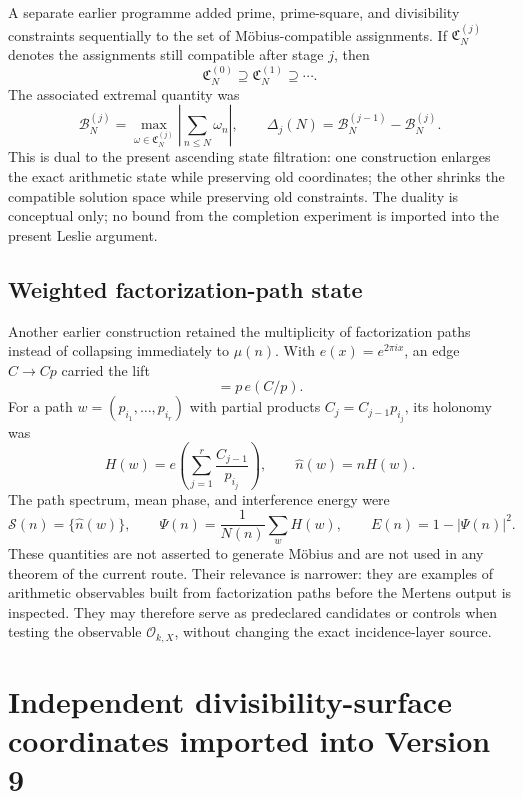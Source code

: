 \documentclass[11pt]{amsart}
\numberwithin{equation}{section}
\theoremstyle{plain}
\theoremstyle{definition}
\theoremstyle{remark}
\begin{document}
A separate earlier programme added prime, prime-square, and divisibility constraints sequentially
to the set of M\"obius-compatible assignments.  If $\mathfrak C_N^{(j)}$ denotes the assignments
still compatible after stage $j$, then
\[
\mathfrak C_N^{(0)}\supseteq\mathfrak C_N^{(1)}\supseteq\cdots.
\]
The associated extremal quantity was
\[
\mathcal B_N^{(j)}=
\max_{\omega\in\mathfrak C_N^{(j)}}
\left|\sum_{n\le N}\omega_n\right|,
\qquad
\Delta_j(N)=\mathcal B_N^{(j-1)}-\mathcal B_N^{(j)}.
\]
This is dual to the present ascending state filtration: one construction enlarges the exact
arithmetic state while preserving old coordinates; the other shrinks the compatible solution
space while preserving old constraints.  The duality is conceptual only; no bound from the
completion experiment is imported into the present Leslie argument.

\subsection{Weighted factorization-path state}

Another earlier construction retained the multiplicity of factorization paths instead of
collapsing immediately to $\mu(n)$.  With $e(x)=e^{2\pi i x}$, an edge
$C\to Cp$ carried the lift
\begin{equation}
[C:p]=p\,e(C/p).
\label{eq:v9_edge_lift}
\end{equation}
For a path $w=(p_{i_1},\ldots,p_{i_r})$ with partial products
$C_j=C_{j-1}p_{i_j}$, its holonomy was
\begin{equation}
H(w)=e\!\left(\sum_{j=1}^r\frac{C_{j-1}}{p_{i_j}}\right),
\qquad
\widehat n(w)=nH(w).
\label{eq:v9_path_holonomy}
\end{equation}
The path spectrum, mean phase, and interference energy were
\begin{equation}
\mathcal S(n)=\{\widehat n(w)\},
\qquad
\Psi(n)=\frac1{N(n)}\sum_wH(w),
\qquad
E(n)=1-|\Psi(n)|^2.
\label{eq:v9_path_spectrum_energy}
\end{equation}
These quantities are not asserted to generate M\"obius and are not used in any theorem of the
current route.  Their relevance is narrower: they are examples of arithmetic observables built
from factorization paths before the Mertens output is inspected.  They may therefore serve as
predeclared candidates or controls when testing the observable $\mathcal O_{k,X}$, without
changing the exact incidence-layer source.


\section{Independent divisibility-surface coordinates imported into Version 9}
\label{sec:v9_surface_import}
\end{document}
